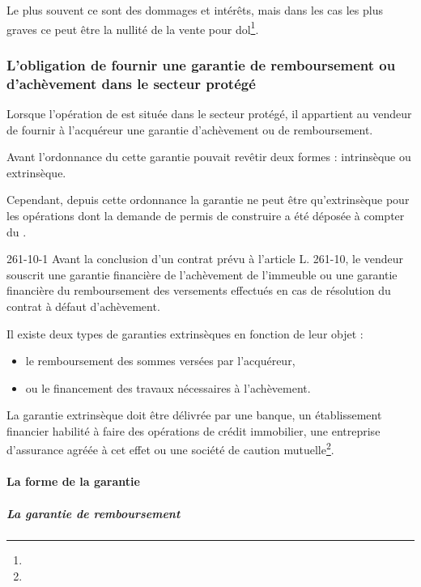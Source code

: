 			Le plus souvent ce sont des dommages et intérêts, mais dans les cas les plus graves ce peut être la nullité de la vente pour dol\footnote{}.


		\subsubsection{L'obligation de fournir une garantie de remboursement ou d'achèvement dans le secteur protégé}

			Lorsque l’opération de \VEFA est située dans le secteur protégé, il appartient au vendeur de fournir à l’acquéreur une garantie d’achèvement ou de remboursement.

			Avant l’ordonnance du  cette garantie pouvait revêtir deux formes : intrinsèque ou extrinsèque.

			Cependant, depuis cette ordonnance la garantie ne peut être qu’extrinsèque pour les opérations dont la demande de permis de construire a été déposée à compter du .

			\begin{citationArticle}[L]{261-10-1}{\cch}
				Avant la conclusion d'un contrat prévu à l'article L. 261-10, le vendeur souscrit une garantie financière de l'achèvement de l'immeuble ou une garantie financière du remboursement des versements effectués en cas de résolution du contrat à défaut d'achèvement.
			\end{citationArticle}

			Il existe deux types de garanties extrinsèques en fonction de leur objet :
			\begin{itemize}
				\item le remboursement des sommes versées par l’acquéreur,
				\item ou le financement des travaux nécessaires à l’achèvement.
			\end{itemize}

			La garantie extrinsèque doit être délivrée par une banque, un établissement financier habilité à faire des opérations de crédit immobilier, une entreprise d’assurance agréée à cet effet ou une société de caution mutuelle\footnote{}.


			\paragraph{La forme de la garantie}

				\subparagraph{La garantie de remboursement} 

